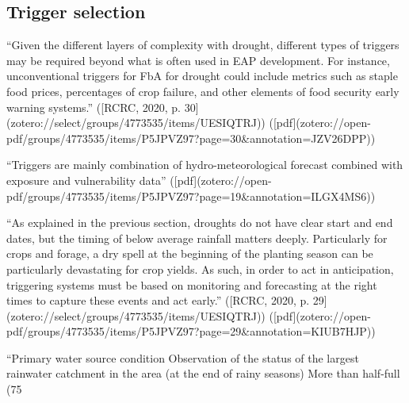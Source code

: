 {%

\subsection{Trigger selection}
“Given the different layers of complexity with drought, different types of triggers may be required beyond what is often used in EAP development. For instance, unconventional triggers for FbA for drought could include metrics such as staple food prices, percentages of crop failure, and other elements of food security early warning systems.” ([RCRC, 2020, p. 30](zotero://select/groups/4773535/items/UESIQTRJ)) ([pdf](zotero://open-pdf/groups/4773535/items/P5JPVZ97?page=30&annotation=JZV26DPP))


“Triggers are mainly combination of hydro-meteorological forecast combined with exposure and vulnerability data” ([pdf](zotero://open-pdf/groups/4773535/items/P5JPVZ97?page=19&annotation=ILGX4MS6))

“As explained in the previous section, droughts do not have clear start and end dates, but the timing of below average rainfall matters deeply. Particularly for crops and forage, a dry spell at the beginning of the planting season can be particularly devastating for crop yields. As such, in order to act in anticipation, triggering systems must be based on monitoring and forecasting at the right times to capture these events and act early.” ([RCRC, 2020, p. 29](zotero://select/groups/4773535/items/UESIQTRJ)) ([pdf](zotero://open-pdf/groups/4773535/items/P5JPVZ97?page=29&annotation=KIUB7HJP))

“Primary water source condition Observation of the status of the largest rainwater catchment in the area (at the end of rainy seasons) More than half-full (75%

}
